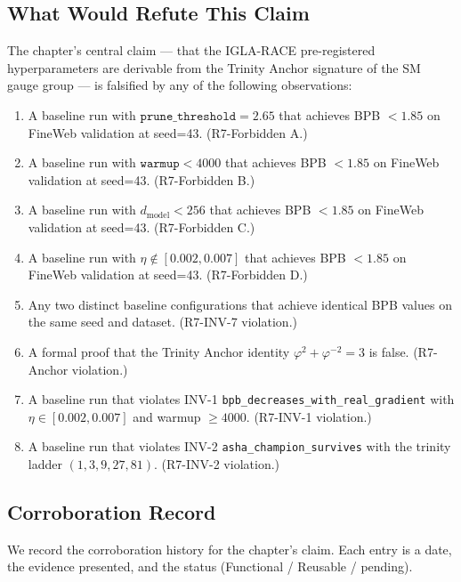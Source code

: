 \subsection{What Would Refute This Claim}

The chapter's central claim --- that the IGLA-RACE pre-registered
hyperparameters are derivable from the Trinity Anchor signature of the
SM gauge group --- is falsified by any of the following observations:

\begin{enumerate}
  \item A baseline run with $\texttt{prune\_threshold}=2.65$ that
        achieves BPB $< 1.85$ on FineWeb validation at seed=43. (R7-Forbidden A.)
  \item A baseline run with $\texttt{warmup} < 4000$ that achieves
        BPB $< 1.85$ on FineWeb validation at seed=43. (R7-Forbidden B.)
  \item A baseline run with $d_{\text{model}} < 256$ that achieves
        BPB $< 1.85$ on FineWeb validation at seed=43. (R7-Forbidden C.)
  \item A baseline run with $\eta \notin [0.002, 0.007]$ that achieves
        BPB $< 1.85$ on FineWeb validation at seed=43. (R7-Forbidden D.)
  \item Any two distinct baseline configurations that achieve
        identical BPB values on the same seed and dataset. (R7-INV-7 violation.)
  \item A formal proof that the Trinity Anchor identity
        $\varphi^{2} + \varphi^{-2} = 3$ is false. (R7-Anchor violation.)
  \item A baseline run that violates INV-1 \texttt{bpb\_decreases\_with\_real\_gradient}
        with $\eta \in [0.002, 0.007]$ and warmup $\geq 4000$. (R7-INV-1 violation.)
  \item A baseline run that violates INV-2 \texttt{asha\_champion\_survives}
        with the trinity ladder $(1, 3, 9, 27, 81)$. (R7-INV-2 violation.)
\end{enumerate}

\subsection{Corroboration Record}

We record the corroboration history for the chapter's claim.
Each entry is a date, the evidence presented, and the status (Functional / Reusable / pending).

